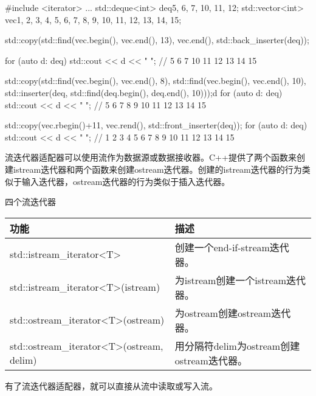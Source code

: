 \begin{cpp}
#include <iterator>
...
std::deque<int> deq{5, 6, 7, 10, 11, 12};
std::vector<int> vec{1, 2, 3, 4, 5, 6, 7, 8, 9, 10, 11, 12, 13, 14, 15};

std::copy(std::find(vec.begin(), vec.end(), 13),
			vec.end(), std::back_inserter(deq));

for (auto d: deq) std::cout << d << " ";
	// 5 6 7 10 11 12 13 14 15

std::copy(std::find(vec.begin(), vec.end(), 8),
std::find(vec.begin(), vec.end(), 10),
std::inserter(deq,
std::find(deq.begin(), deq.end(), 10)));d
for (auto d: deq) std::cout << d << " ";
	// 5 6 7 8 9 10 11 12 13 14 15
	
std::copy(vec.rbegin()+11, vec.rend(),
std::front_inserter(deq));
for (auto d: deq) std::cout << d << " ";
		// 1 2 3 4 5 6 7 8 9 10 11 12 13 14 15
\end{cpp}



流迭代器适配器可以使用流作为数据源或数据接收器。C++提供了两个函数来创建istream迭代器和两个函数来创建ostream迭代器。创建的istream迭代器的行为类似于输入迭代器，ostream迭代器的行为类似于插入迭代器。

\begin{center}
四个流迭代器
\end{center}


\begin{longtable}[c]{|l|l|}
\hline
\textbf{功能}                                         & \textbf{描述}                     \\ \hline
\endfirsthead
%
\endhead
%
std::istream\_iterator\textless{}T\textgreater{}          & 创建一个end-if-stream迭代器。       \\ \hline
std::istream\_iterator\textless{}T\textgreater{}(istream) & 为istream创建一个istream迭代器。 \\ \hline
std::ostream\_iterator\textless{}T\textgreater{}(ostream) & 为ostream创建ostream迭代器。 \\ \hline
std::ostream\_iterator\textless{}T\textgreater{}(ostream, delim) & 用分隔符delim为ostream创建ostream迭代器。 \\ \hline
\end{longtable}


有了流迭代器适配器，就可以直接从流中读取或写入流。

